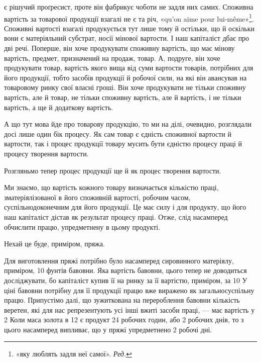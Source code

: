 \parcont{}  %
є рішучий проґресист, проте він фабрикує чоботи не задля них
самих. Споживна вартість за товарової продукції взагалі не є
та річ, «qu’on aime pour lui-même»\footnote*{
«яку люблять задля неї самої». \emph{Ред.}
}. Споживні вартості взагалі
продукується тут лише тому й остільки, що й оскільки вони є
матеріяльний субстрат, носії мінової вартости. І наш капіталіст
дбає про дві речі. Поперше, він хоче продукувати споживну
вартість, що має мінову вартість, предмет, призначений на продаж,
товар. А, подруге, він хоче продукувати товар, вартість
якого вища від суми вартости товарів, потрібних для його продукції,
тобто засобів продукції й робочої сили, на які він авансував
на товаровому ринку свої власні гроші. Він хоче продукувати
не тільки споживну вартість, але й товар, не тільки споживну
вартість, але й вартість, і не тільки вартість, а ще й додаткову
вартість.

А що тут мова йде про товарову продукцію, то ми на ділі,
очевидно, розглядали досі лише один бік процесу. Як сам товар
є єдність споживної вартости й вартости, так і процес продукції
товару мусить бути єдністю процесу праці й процесу творення
вартости.

Розгляньмо тепер процес продукції ще й як процес творення
вартости.

Ми знаємо, що вартість кожного товару визначається кількістю
праці, зматеріялізованої в його споживній вартості, робочим
часом, суспільно\dash{}доконечним для його продукції. Це має силу
і для продукту, що його наш капіталіст дістав як результат процесу
праці. Отже, слід насамперед обчислити працю, упредметнену
в цьому продукті.

Нехай це буде, приміром, пряжа.

Для виготовлення пряжі потрібно було насамперед сировинного
матеріялу, приміром, 10 фунтів бавовни. Яка вартість бавовни,
цього тепер не доводиться досліджувати, бо капіталіст
купив її на ринку за її вартістю, приміром, за 10 У ціні
бавовни потрібну для її продукції працю вже виражено як загальносуспільну
працю. Припустімо далі, що зужиткована на
перероблення бавовни кількість веретен, які для нас репрезентують
усі інші вжиті засоби праці, — має вартість у 2
Коли маса золота в 12 є продукт 24 робочих годин, або
2 робочих днів, то з цього насамперед випливає, що у пряжі упредметнено
2 робочі дні.

